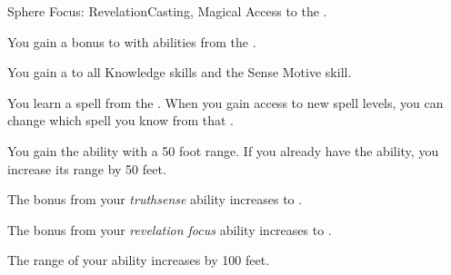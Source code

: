     \begin{feat}{Sphere Focus: Revelation}{Casting, Magical}
        \featpre Access to the  .

         You gain a  bonus to  with abilities from the  .

         You gain a   to all Knowledge skills and the Sense Motive skill.

         You learn a spell from the  .
        When you gain access to new spell levels, you can change which spell you know from that .

         You gain the  ability with a 50 foot range.
        If you already have the  ability, you increase its range by 50 feet.

         The bonus from your \textit{truthsense} ability increases to .

         The bonus from your \textit{revelation focus} ability increases to .

         The range of your  ability increases by 100 feet.
    \end{feat}

